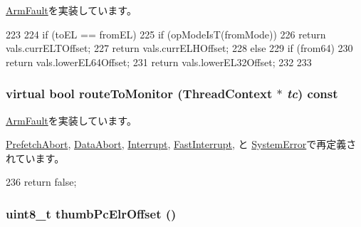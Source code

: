 \hyperlink{classArmISA_1_1ArmFault_aa7f9ab8b5a2e4da88efdfcb60c8d2574}{ArmFault}を実装しています。


\begin{DoxyCode}
223     {
224         if (toEL == fromEL) {
225             if (opModeIsT(fromMode))
226                 return vals.currELTOffset;
227             return vals.currELHOffset;
228         } else {
229             if (from64)
230                 return vals.lowerEL64Offset;
231             return vals.lowerEL32Offset;
232         }
233     }
\end{DoxyCode}
\hypertarget{classArmISA_1_1ArmFaultVals_a9a0a467b98f43890c1d89d1d59a5923c}{
\subsubsection[{routeToMonitor}]{\setlength{\rightskip}{0pt plus 5cm}virtual bool routeToMonitor ({\bf ThreadContext} $\ast$ {\em tc}) const}}
\label{classArmISA_1_1ArmFaultVals_a9a0a467b98f43890c1d89d1d59a5923c}


\hyperlink{classArmISA_1_1ArmFault_af62e0649938431df8cfab96f0e3fb0a1}{ArmFault}を実装しています。

\hyperlink{classArmISA_1_1PrefetchAbort_afd7a21fdb010230ad53094254739dde8}{PrefetchAbort}, \hyperlink{classArmISA_1_1DataAbort_afd7a21fdb010230ad53094254739dde8}{DataAbort}, \hyperlink{classArmISA_1_1Interrupt_afd7a21fdb010230ad53094254739dde8}{Interrupt}, \hyperlink{classArmISA_1_1FastInterrupt_afd7a21fdb010230ad53094254739dde8}{FastInterrupt}, と \hyperlink{classArmISA_1_1SystemError_afd7a21fdb010230ad53094254739dde8}{SystemError}で再定義されています。


\begin{DoxyCode}
236 { return false; }
\end{DoxyCode}
\hypertarget{classArmISA_1_1ArmFaultVals_a75dbff4cd777bfd8db18b862970689e2}{
\subsubsection[{thumbPcElrOffset}]{\setlength{\rightskip}{0pt plus 5cm}uint8\_\-t thumbPcElrOffset ()}}
\label{classArmISA_1_1ArmFaultVals_a75dbff4cd777bfd8db18b862970689e2}


